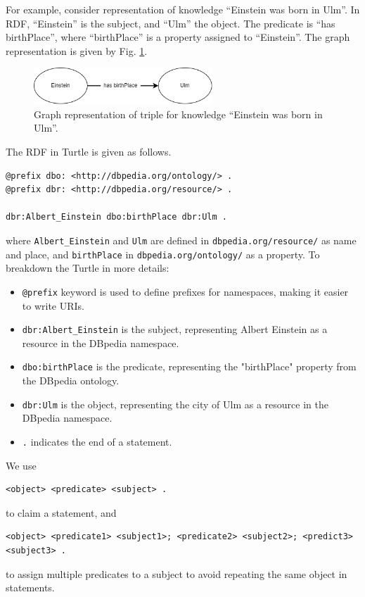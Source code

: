 For example, consider representation of knowledge ``Einstein was born in Ulm''. In RDF, ``Einstein'' is the subject, and ``Ulm'' the object. The predicate is ``has birthPlace'', where ``birthPlace'' is a property assigned to ``Einstein''. The graph representation is given by Fig. \ref{fig:einsteinexp}.
\begin{figure}[htbp]
	\centering
	\includegraphics[width=0.6\textwidth]{./chapters/ch-semanticwebarchitecture/figures/einsteinexp.png}
	\caption{Graph representation of triple for knowledge ``Einstein was born in Ulm''.}
	\label{fig:einsteinexp}
\end{figure}
The RDF in Turtle is given as follows.
\begin{lstlisting}
@prefix dbo: <http://dbpedia.org/ontology/> .
@prefix dbr: <http://dbpedia.org/resource/> .

dbr:Albert_Einstein dbo:birthPlace dbr:Ulm .
\end{lstlisting}
where \verb|Albert_Einstein| and \verb|Ulm| are defined in \verb|dbpedia.org/resource/| as name and place, and \verb|birthPlace| in \verb|dbpedia.org/ontology/| as a property. To breakdown the Turtle in more details:
\begin{itemize}
  \item \verb|@prefix| keyword is used to define prefixes for namespaces, making it easier to write URIs.
  \item \verb|dbr:Albert_Einstein| is the subject, representing Albert Einstein as a resource in the DBpedia namespace.
  \item \verb|dbo:birthPlace| is the predicate, representing the "birthPlace" property from the DBpedia ontology.
  \item \verb|dbr:Ulm| is the object, representing the city of Ulm as a resource in the DBpedia namespace.
  \item \verb|.| indicates the end of a statement.
\end{itemize}

We use
\begin{lstlisting}
<object> <predicate> <subject> .
\end{lstlisting}
to claim a statement, and
\begin{lstlisting}
<object> <predicate1> <subject1>; <predicate2> <subject2>; <predict3> <subject3> .
\end{lstlisting}
to assign multiple predicates to a subject to avoid repeating the same object in statements.

